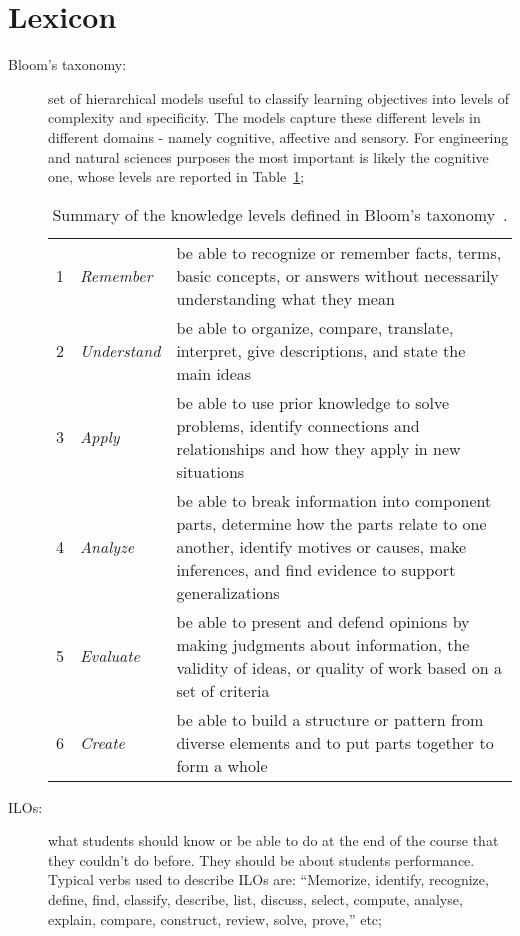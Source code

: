 \section{Lexicon}
\label{sec:lexicon}

\begin{description}

	\item[Bloom's taxonomy:] set of hierarchical models useful to
		classify learning objectives into levels of complexity and
		specificity. The models capture these different levels in
		different domains - namely cognitive, affective and sensory.
		For engineering and natural sciences purposes the most
		important is likely the cognitive one, whose levels are
		reported in Table~\ref{tab:blooms-taxonomy};

		\begin{table}[!htbp]
			\centering
			\begin{tabular}{|llp{}|}
				\hline
				1 & \emph{Remember} & be able to recognize
				or remember facts, terms, basic concepts, or
				answers without necessarily understanding
				what they mean \\
				2 & \emph{Understand} & be able to organize,
				compare, translate, interpret, give
				descriptions, and state the main ideas \\
				3 & \emph{Apply} & be able to use prior
				knowledge to solve problems, identify
				connections and relationships and how they
				apply in new situations \\
				4 & \emph{Analyze} & be able to break
				information into component parts, determine
				how the parts relate to one another,
				identify motives or causes, make inferences,
				and find evidence to support generalizations
				\\
				5 & \emph{Evaluate} & be able to present and
				defend opinions by making judgments about
				information, the validity of ideas, or
				quality of work based on a set of criteria
				\\
				6 & \emph{Create} & be able to build a
				structure or pattern from diverse elements
				and to put parts together to form a whole \\
				\hline
			\end{tabular}
			\caption{Summary of the knowledge levels defined in
			Bloom's taxonomy~\cite{bloom1956taxonomy}.}
			\label{tab:blooms-taxonomy}
		\end{table}

	\item[\acfp{ILO}:] what students should know or be able to do at the
		end of the course that they couldn't do before. They should
		be about students performance. Typical verbs used to
		describe \acp{ILO} are: ``Memorize, identify, recognize,
		define, find, classify, describe, list, discuss, select,
		compute, analyse, explain, compare, construct, review,
		solve, prove,'' etc;


\end{description}
